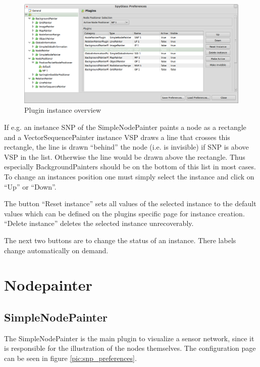 \begin{figure}[htb]
  \begin{center}
    \includegraphics[width=13.2cm]{./pics/plugin_instances_overview}
    \caption{Plugin instance overview}
    \label{pic:plugin_instances_overview}
  \end{center}
\end{figure}

If e.g. an instance SNP of the SimpleNodePainter paints a node as a rectangle and a VectorSequencePainter instance VSP
draws a line that crosses this rectangle, the line is drawn ``behind'' the node (i.e. is invisible) if SNP
is above VSP in the list. Otherwise the line would be drawn above the rectangle. Thus especially BackgroundPainters
should be on the bottom of this list in most cases. To change an
instances position one must simply select the instance and click on ``Up'' or ``Down''.

The button ``Reset instance'' sets all values of the selected instance to the default values which can be defined on the
plugins specific page for instance creation. ``Delete instance'' deletes the selected instance unrecoverably.

The next two buttons are to change the status of an instance. There labels change automatically on demand.

\newpage
\section{Nodepainter}

\subsection{SimpleNodePainter}

The SimpleNodePainter is the main plugin to visualize a sensor network, since it is responsible for the illustration
of the nodes themselves. The configuration page can be seen in figure \ref{pic:snp_preferences}.

